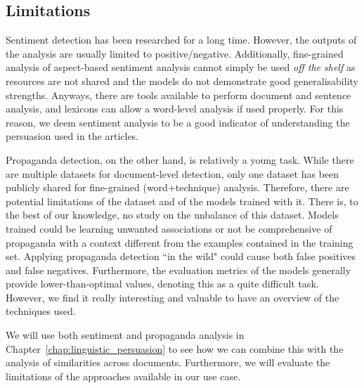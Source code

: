 \subsection{\statusgreen Limitations}

Sentiment detection has been researched for a long time.
However, the outputs of the analysis are usually limited to positive/negative.
Additionally, fine-grained analysis of aspect-based sentiment analysis cannot simply be used \emph{off the shelf} as resources are not shared and the models do not demonstrate good generalisability strengths.
Anyways, there are tools available to perform document and sentence analysis, and lexicons can allow a word-level analysis if used properly.
For this reason, we deem sentiment analysis to be a good indicator of understanding the persuasion used in the articles.

Propaganda detection, on the other hand, is relatively a young task.
While there are multiple datasets for document-level detection, only one dataset has been publicly shared for fine-grained (word+technique) analysis.
Therefore, there are potential limitations of the dataset and of the models trained with it.
There is, to the best of our knowledge, no study on the unbalance of this dataset. Models trained could be learning unwanted associations or not be comprehensive of propaganda with a context different from the examples contained in the training set.
Applying propaganda detection ``in the wild" could cause both false positives and false negatives.
Furthermore, the evaluation metrics of the models generally provide lower-than-optimal values, denoting  this as a quite difficult task.
However, we find it really interesting and valuable to have an overview of the techniques used.

We will use both sentiment and propaganda analysis in Chapter~\ref{chap:linguistic_persuasion} to see how we can combine this with the analysis of similarities across documents.
Furthermore, we will evaluate the limitations of the approaches available in our use case.

